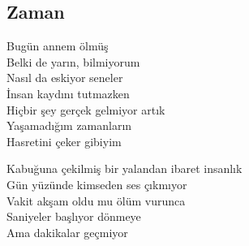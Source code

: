 \subsection{Zaman}

Bugün annem ölmüş \\
Belki de yarın, bilmiyorum \\
Nasıl da eskiyor seneler \\
İnsan kaydını tutmazken \\
Hiçbir şey gerçek gelmiyor artık \\
Yaşamadığım zamanların \\
Hasretini çeker gibiyim

\noindent\newline
Kabuğuna çekilmiş bir yalandan ibaret insanlık \\
Gün yüzünde kimseden ses çıkmıyor \\
Vakit akşam oldu mu ölüm vurunca \\
Saniyeler başlıyor dönmeye \\
Ama dakikalar geçmiyor